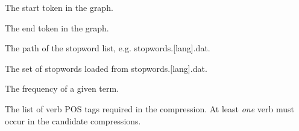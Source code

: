 \documentclass[letterpaper,10pt,english]{sphinxmanual}
\begin{document}
\begin{fulllineitems}
\begin{fulllineitems}
\end{fulllineitems}


\begin{fulllineitems}
\label{index:takahe.word_graph.start}
The start token in the graph.

\end{fulllineitems}


\begin{fulllineitems}
\label{index:takahe.word_graph.stop}
The end token in the graph.

\end{fulllineitems}


\begin{fulllineitems}
\label{index:takahe.word_graph.stopword_path}
The path of the stopword list, e.g. stopwords.{[}lang{]}.dat.

\end{fulllineitems}


\begin{fulllineitems}
\label{index:takahe.word_graph.stopwords}
The set of stopwords loaded from stopwords.{[}lang{]}.dat.

\end{fulllineitems}


\begin{fulllineitems}
\label{index:takahe.word_graph.term_freq}
The frequency of a given term.

\end{fulllineitems}


\begin{fulllineitems}
\label{index:takahe.word_graph.verbs}
The list of verb POS tags required in the compression. At least \emph{one}
verb must occur in the candidate compressions.


\end{fulllineitems}
\end{fulllineitems}
\end{document}
